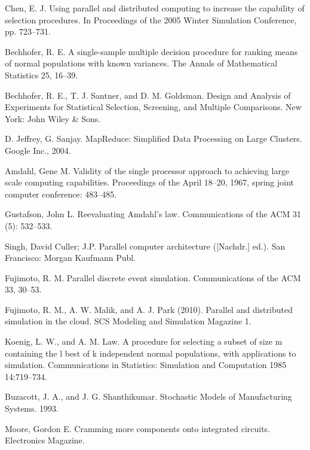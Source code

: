 \documentclass[12pt,a4paper]{report}
\begin{document}
\begin{thebibliography}{99}
 Chen, E. J. Using parallel and distributed computing to increase the capability of selection procedures. In Proceedings of the 2005 Winter Simulation Conference, pp. 723–731.

 Bechhofer, R. E. A single-sample multiple decision procedure for ranking means of normal populations with known variances. The Annals of Mathematical Statistics 25, 16–39.

 Bechhofer, R. E., T. J. Santner, and D. M. Goldsman. Design and Analysis of Experiments for Statistical Selection, Screening, and Multiple Comparisons. New York: John Wiley \& Sons.

 D. Jeffrey, G. Sanjay. MapReduce: Simplified Data Processing on Large Clusters. Google Inc., 2004.

 Amdahl, Gene M. Validity of the single processor approach to achieving large scale computing capabilities. Proceedings of the April 18–20, 1967, spring joint computer conference: 483–485.

 Gustafson, John L. Reevaluating Amdahl's law. Communications of the ACM 31 (5): 532–533.

 Singh, David Culler; J.P. Parallel computer architecture ([Nachdr.] ed.). San Francisco: Morgan Kaufmann Publ.

 Fujimoto, R. M. Parallel discrete event simulation. Communications of the ACM 33, 30–53.

 Fujimoto, R. M., A. W. Malik, and A. J. Park (2010). Parallel and distributed simulation in the cloud. SCS Modeling and Simulation Magazine 1.

 Koenig, L. W., and A. M. Law. A procedure for selecting a subset of size m containing the l best of k independent normal populations, with applications to simulation. Communications in Statistics: Simulation and Computation 1985 14:719–734.

 Buzacott, J. A., and J. G. Shanthikumar. Stochastic Models of Manufacturing Systems. 1993.

 Moore, Gordon E. Cramming more components onto integrated circuits. Electronics Magazine.

\end{thebibliography}
\end{document}
